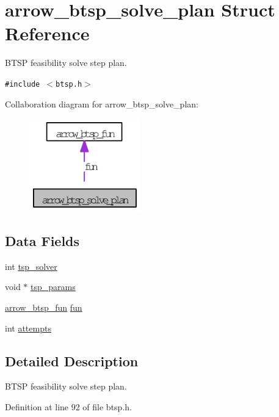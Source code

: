 \hypertarget{structarrow__btsp__solve__plan}{
\section{arrow\_\-btsp\_\-solve\_\-plan Struct Reference}
\label{structarrow__btsp__solve__plan}
}
BTSP feasibility solve step plan.  


{\tt \#include $<$btsp.h$>$}

Collaboration diagram for arrow\_\-btsp\_\-solve\_\-plan:\nopagebreak
\begin{figure}[H]
\begin{center}
\leavevmode
\includegraphics[width=136pt]{structarrow__btsp__solve__plan__coll__graph}
\end{center}
\end{figure}
\subsection*{Data Fields}
\begin{CompactItemize}
\item 
int \hyperlink{structarrow__btsp__solve__plan_911facf12673ddb5c3eb024fa12ee18d}{tsp\_\-solver}
\item 
void $\ast$ \hyperlink{structarrow__btsp__solve__plan_2b7cf65583f45c990218139dbae34ae5}{tsp\_\-params}
\item 
\hyperlink{structarrow__btsp__fun}{arrow\_\-btsp\_\-fun} \hyperlink{structarrow__btsp__solve__plan_89fa2ad1bcc026cd50fd7abc6c30ce3e}{fun}
\item 
int \hyperlink{structarrow__btsp__solve__plan_acfa3d4257a33548a9f60ee568219bc5}{attempts}
\end{CompactItemize}


\subsection{Detailed Description}
BTSP feasibility solve step plan. 

Definition at line 92 of file btsp.h.

